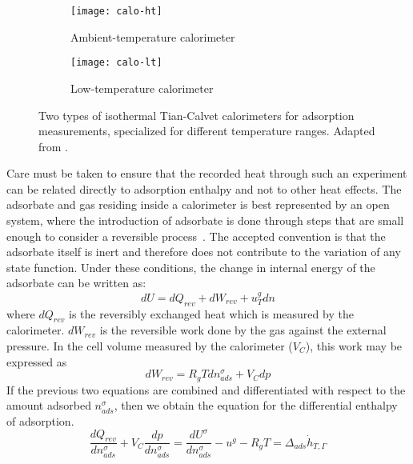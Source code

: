 \begin{figure}[htb]

	\centering
	\begin{subfigure}[b]{.45\textwidth}
		\centering
		\texttt{[image: calo-ht]}
		\caption{Ambient-temperature calorimeter}%
		\label{calo:fig:calo-ht}
	\end{subfigure}
	\begin{subfigure}[b]{.5\textwidth}
		\centering
		\texttt{[image: calo-lt]}
		\caption{Low-temperature calorimeter}%
		\label{calo:fig:calo-lt}
	\end{subfigure}%
	\caption{Two types of isothermal Tian-Calvet calorimeters
		for adsorption measurements, specialized for
		different temperature ranges.
		Adapted from \citet{llewellynGasAdsorptionMicrocalorimetry2005}.
	}%
	\label{calo:fig:calo-types}

\end{figure}

Care must be taken to ensure that
the recorded heat through such an experiment can be related directly
to adsorption enthalpy and not to other heat effects.
The adsorbate and gas residing inside a calorimeter is best
represented by an open system, where the introduction of adsorbate
is done through steps that are small enough to consider a reversible
process~\cite{rouquerolGasSolidInteractions1980}.
The accepted convention is that the adsorbate itself is inert and
therefore does not contribute to the variation of any state function.
Under these conditions,
the change in internal energy of the adsorbate can be written as:
%
\begin{equation}
	dU = dQ_{rev} + dW_{rev} + u_T^g dn
\end{equation}
%
where \(dQ_{rev}\) is the reversibly exchanged heat which is
measured by the calorimeter. \(dW_{rev}\) is the reversible work
done by the gas against the external pressure. In the cell volume measured
by the calorimeter (\(V_C\)), this work may be expressed as
%
\begin{equation}
	dW_{rev} = R_g T dn_{ads}^{\sigma} + V_C dp
\end{equation}
%
If the previous two equations are combined and differentiated with
respect to the amount adsorbed \(n_{ads}^{\sigma}\), then we obtain
the equation for the differential enthalpy of adsorption.
%
\begin{equation}
	\frac{dQ_{rev}}{dn_{ads}^{\sigma}} + V_C \frac{dp}{dn_{ads}^{\sigma}} = %
	\frac{dU^{\sigma}}{dn_{ads}^{\sigma}} - u^g - R_g T = \Delta_{ads}\dot{h}_{T, \Gamma}
\end{equation}

